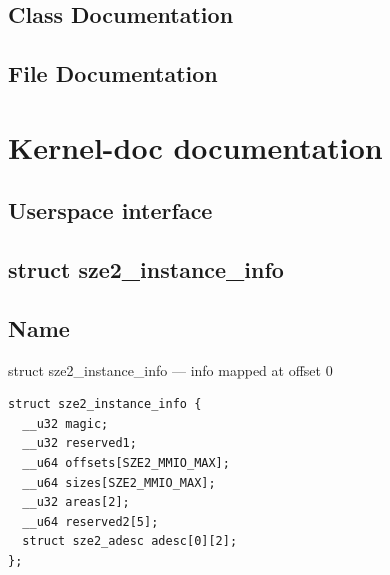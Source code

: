   \section{Class Documentation}
  
  
  \section{File Documentation}
  


\chapter{Kernel-doc documentation}
  \label{app.kdoc}
\section{Userspace interface}
\label{id230790}\hypertarget{id230790}{}%
% 
\section*{struct sze2\_instance\_info}
\label{API-struct-sze2-instance-info}\hypertarget{API-struct-sze2-instance-info}{}%
\label{id236309}

\section*{Name}
struct sze2\_instance\_info --- info mapped at offset 0\label{id207141}

\begin{Verbatim}[]
struct sze2_instance_info {
  __u32 magic;
  __u32 reserved1;
  __u64 offsets[SZE2_MMIO_MAX];
  __u64 sizes[SZE2_MMIO_MAX];
  __u32 areas[2];
  __u64 reserved2[5];
  struct sze2_adesc adesc[0][2];
};  
\end{Verbatim}

\label{id207154}

